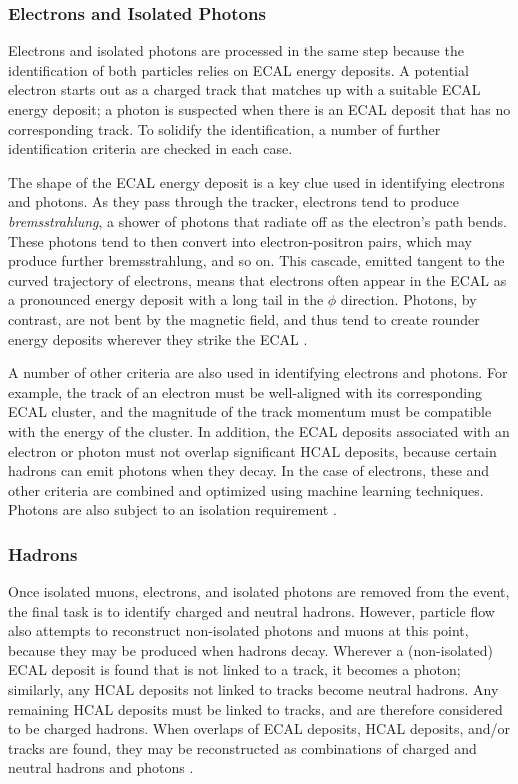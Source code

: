 \subsubsection{Electrons and Isolated Photons}
\label{sssec:cms:pf:egamma}

Electrons and isolated photons are processed in the same step because the
identification of both particles relies on ECAL energy deposits. A
potential electron starts out as a charged track that matches up with
a suitable ECAL energy deposit; a photon is suspected when there
is an ECAL deposit that has no corresponding track. To solidify the
identification, a number of further identification criteria are
checked in each case.

The shape of the ECAL energy deposit is a key clue used in identifying
electrons and photons. As they pass through the tracker, electrons
tend to produce \emph{bremsstrahlung}, a shower of photons that
radiate off as the electron's path bends. These photons tend to then
convert into electron-positron pairs, which may produce further
bremsstrahlung, and so on. This cascade, emitted tangent to the curved
trajectory of electrons, means that electrons often appear in the ECAL
as a pronounced energy deposit with a long tail in the $\phi$
direction. Photons, by contrast, are not bent by the magnetic field,
and thus tend to create rounder energy deposits wherever they strike
the ECAL \cite{particleflow}.

A number of other criteria are also used in identifying electrons and
photons. For example, the track of an electron must be well-aligned
with its corresponding ECAL cluster, and the magnitude of the track
momentum must be compatible with the energy of the cluster. In
addition, the ECAL deposits associated with an electron or photon must
not overlap significant HCAL deposits, because certain hadrons can
emit photons when they decay. In the case of electrons, these and
other criteria are combined and optimized using machine learning
techniques. Photons are also subject to an isolation requirement \cite{particleflow}.

\subsubsection{Hadrons}
\label{sssec:cms:pf:hadrons}

Once isolated muons, electrons, and isolated photons are removed from
the event, the final task is to identify charged and neutral
hadrons. However, particle flow also attempts to reconstruct
non-isolated photons and muons at this point, because they may be produced when
hadrons decay. Wherever a (non-isolated) ECAL deposit is found that is
not linked to a track, it becomes a photon; similarly, any HCAL
deposits not linked to tracks become neutral hadrons. Any remaining
HCAL deposits must be linked to tracks, and are therefore considered
to be charged hadrons. When overlaps of ECAL deposits, HCAL deposits,
and/or tracks are found, they may be reconstructed as combinations of
charged and neutral hadrons and photons \cite{particleflow}.

